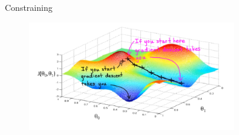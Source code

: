 \documentclass[presentation]{beamer}\mode<presentation>{\usetheme{AMSBolognaFC}}
\begin{document}
\begin{frame}[allowframebreaks]{Constraining}
    \framebreak

    \begin{figure}
        \centering
        \includegraphics[width=0.8\textwidth]{figures/nn-gradient-descent.png}
    \end{figure}    
\end{frame}
\end{document}
